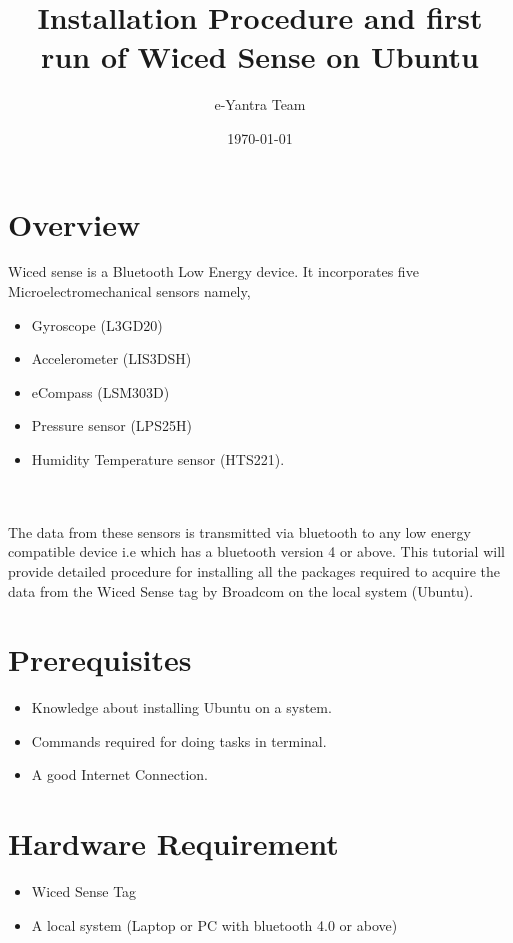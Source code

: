 \documentclass[11pt,a4paper]{article}
\begin{document}
\begin{titlepage}
\title{Installation Procedure and first run of Wiced Sense on Ubuntu}
\author{e-Yantra Team}
\date{\today}
\maketitle
\end{titlepage}

    \tableofcontents
    \newpage
	\section{Overview}
	 {\Large \hspace{7mm} Wiced sense is a Bluetooth Low Energy device. It incorporates five Microelectromechanical sensors namely,
	 \begin{itemize}
	 \\\item Gyroscope (L3GD20)\\ \item Accelerometer (LIS3DSH)\\\item eCompass (LSM303D)\\\item Pressure sensor (LPS25H)\\\item Humidity Temperature sensor (HTS221).
	 \end{itemize}\\ \\The data from these sensors is transmitted via bluetooth to any low energy compatible device i.e which has a bluetooth version 4 or above.
	 This tutorial will provide detailed procedure for installing all the packages required to acquire the data from the Wiced Sense tag by Broadcom on the local system (Ubuntu).}
	 
	\newpage
	\section{Prerequisites}
	\begin{itemize}
	\item Knowledge about installing Ubuntu on a system.
	\item Commands required for doing tasks in terminal.
	\item A good Internet Connection.
	\end{itemize}
	
	\section{Hardware Requirement}
	\begin{itemize}
	\item Wiced Sense Tag
	\item A local system (Laptop or PC with bluetooth 4.0 or above)
	\end{itemize}
	
\end{document}
